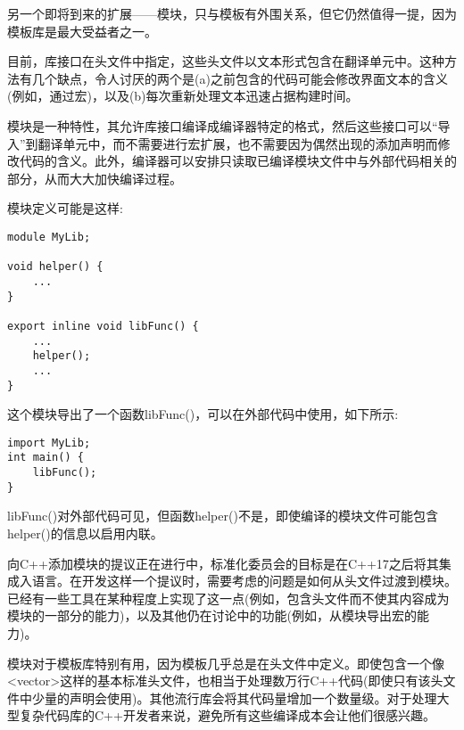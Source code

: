 另一个即将到来的扩展——模块，只与模板有外围关系，但它仍然值得一提，因为模板库是最大受益者之一。

目前，库接口在头文件中指定，这些头文件以文本形式包含在翻译单元中。这种方法有几个缺点，令人讨厌的两个是(a)之前包含的代码可能会修改界面文本的含义(例如，通过宏)，以及(b)每次重新处理文本迅速占据构建时间。

模块是一种特性，其允许库接口编译成编译器特定的格式，然后这些接口可以“导入”到翻译单元中，而不需要进行宏扩展，也不需要因为偶然出现的添加声明而修改代码的含义。此外，编译器可以安排只读取已编译模块文件中与外部代码相关的部分，从而大大加快编译过程。

模块定义可能是这样:

\begin{lstlisting}[style=styleCXX]
module MyLib;

void helper() {
	...
}

export inline void libFunc() {
	...
	helper();
	...
}
\end{lstlisting}

这个模块导出了一个函数libFunc()，可以在外部代码中使用，如下所示:

\begin{lstlisting}[style=styleCXX]
import MyLib;
int main() {
	libFunc();
}
\end{lstlisting}

libFunc()对外部代码可见，但函数helper()不是，即使编译的模块文件可能包含helper()的信息以启用内联。

向C++添加模块的提议正在进行中，标准化委员会的目标是在C++17之后将其集成入语言。在开发这样一个提议时，需要考虑的问题是如何从头文件过渡到模块。已经有一些工具在某种程度上实现了这一点(例如，包含头文件而不使其内容成为模块的一部分的能力)，以及其他仍在讨论中的功能(例如，从模块导出宏的能力)。

模块对于模板库特别有用，因为模板几乎总是在头文件中定义。即使包含一个像<vector>这样的基本标准头文件，也相当于处理数万行C++代码(即使只有该头文件中少量的声明会使用)。其他流行库会将其代码量增加一个数量级。对于处理大型复杂代码库的C++开发者来说，避免所有这些编译成本会让他们很感兴趣。































